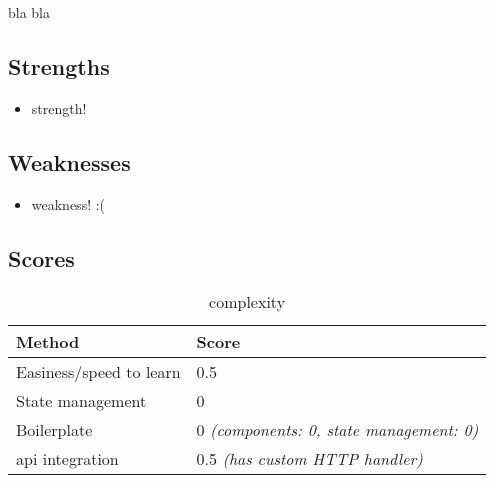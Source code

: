 
bla bla \cite{designsystemcentral:web_components}

\subsection{Strengths}
\label{subsec:lit:strengths}
\begin{itemize}
    \item strength! 
\end{itemize}

\subsection{Weaknesses}
\label{subsec:lit:weaknesses}
\begin{itemize}
    \item weakness! :( 
\end{itemize}


\subsection{Scores}
\label{subsec:lit:scores}


\begin{table}[H]
    \centering
    \begin{tabular}{|l|l|}
        \hline
        \textbf{Method}            & \textbf{Score}                                  \\
        \hline
        Easiness/speed to learn    & 0.5                                             \\ \hline
        State management           & 0                                               \\ \hline
        Boilerplate                & 0 \textit{(components: 0, state management: 0)} \\ \hline
        \acrshort{api} integration & 0.5 \textit{(has custom HTTP handler)}          \\ \hline
    \end{tabular}
    \caption{complexity}
    \label{tab:lit:complexity}
\end{table}


